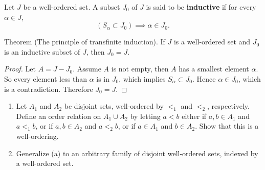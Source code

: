 \begin{exercise}\label{chapter1:section10:exercise7}
    Let $J$ be a well-ordered set. A subset $J_{0}$ of $J$ is said to be \textbf{inductive} if for every $\alpha\in J$,
    \[
        (S_{\alpha}\subset J_{0})\implies \alpha \in J_{0}.
    \]

    Theorem (The principle of transfinite induction). If $J$ is a well-ordered set and $J_{0}$ is an inductive subset of $J$, then $J_{0} = J$.
\end{exercise}

\begin{proof}
    Let $A = J - J_{0}$. Assume $A$ is not empty, then $A$ has a smallest element $\alpha$. So every element less than $\alpha$ is in $J_{0}$, which implies $S_{\alpha}\subset J_{0}$. Hence $\alpha\in J_{0}$, which is a contradiction. Therefore $J_{0} = J$.
\end{proof}

\begin{exercise}\label{chapter1:section10:exercise8}
    \begin{enumerate}[label={(\alph*)}]
        \item Let $A_{1}$ and $A_{2}$ be disjoint sets, well-ordered by $<_{1}$ and $<_{2}$, respectively. Define an order relation on $A_{1}\cup A_{2}$ by letting $a < b$ either if $a, b\in A_{1}$ and $a <_{1} b$, or if $a, b\in A_{2}$ and $a <_{2} b$, or if $a\in A_{1}$ and $b\in A_{2}$. Show that this is a well-ordering.
        \item Generalize (a) to an arbitrary family of disjoint well-ordered sets, indexed by a well-ordered set.
    \end{enumerate}
\end{exercise}

